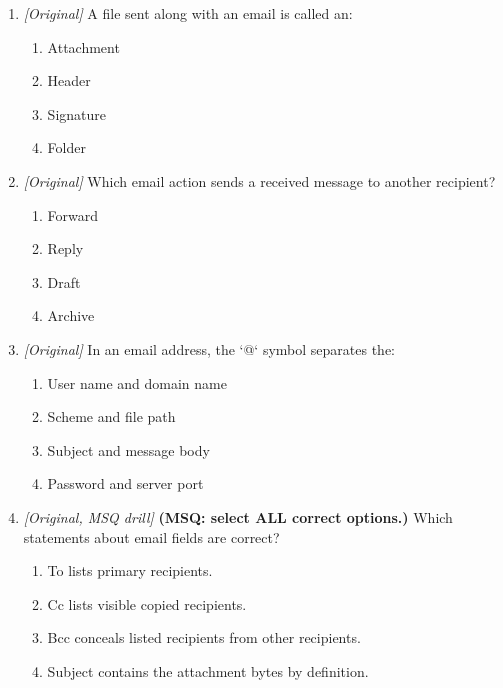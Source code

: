 \begin{enumerate}[label=\textbf{Q\arabic*.}, leftmargin=*]
\item \textit{[Original]} A file sent along with an email is called an:
  \begin{enumerate}[label=\Alph*.]
\item Attachment
   \item Header
   \item Signature
   \item Folder
  \end{enumerate}

\item \textit{[Original]} Which email action sends a received message to another recipient?
  \begin{enumerate}[label=\Alph*.]
\item Forward
   \item Reply
   \item Draft
   \item Archive
  \end{enumerate}

\item \textit{[Original]} In an email address, the `@` symbol separates the:
  \begin{enumerate}[label=\Alph*.]
\item User name and domain name
   \item Scheme and file path
   \item Subject and message body
   \item Password and server port
  \end{enumerate}

\item \textit{[Original, MSQ drill]} \textbf{(MSQ: select ALL correct options.)} Which statements about email fields are correct?
  \begin{enumerate}[label=\Alph*.]
\item To lists primary recipients.
   \item Cc lists visible copied recipients.
   \item Bcc conceals listed recipients from other recipients.
   \item Subject contains the attachment bytes by definition.
  \end{enumerate}

\end{enumerate}

